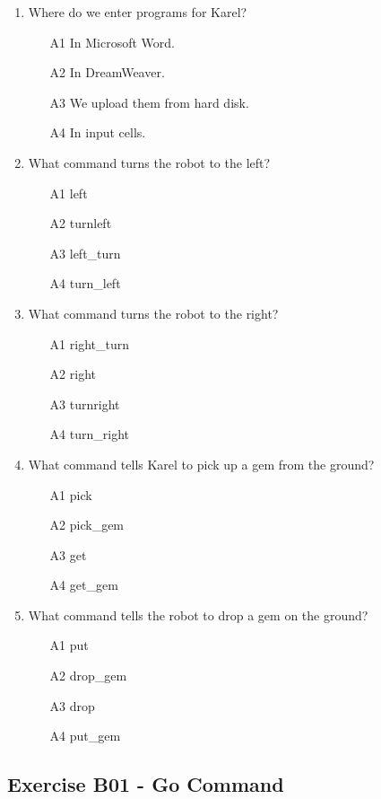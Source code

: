 \documentclass[article,A4,12pt]{llncs}
\begin{document}
\begin{enumerate}
\item Where do we enter programs for Karel?
\begin{enumerate}
\item[A1] In Microsoft Word.
\item[A2] In DreamWeaver.
\item[A3] We upload them from hard disk.
\item[A4] In input cells.
\end{enumerate}
\item What command turns the robot to the left?
\begin{enumerate}
\item[A1] left
\item[A2] turnleft
\item[A3] left\_turn
\item[A4] turn\_left
\end{enumerate}
\item What command turns the robot to the right?
\begin{enumerate}
\item[A1] right\_turn
\item[A2] right
\item[A3] turnright
\item[A4] turn\_right
\end{enumerate}
\item What command tells Karel to pick up a gem from the ground?
\begin{enumerate}
\item[A1] pick
\item[A2] pick\_gem
\item[A3] get
\item[A4] get\_gem
\end{enumerate}
\item What command tells the robot to drop a gem on the ground?
\begin{enumerate}
\item[A1] put
\item[A2] drop\_gem
\item[A3] drop 
\item[A4] put\_gem
\end{enumerate}
\end{enumerate}

\newpage
\subsection{Exercise B01 - Go Command}
\end{document}
